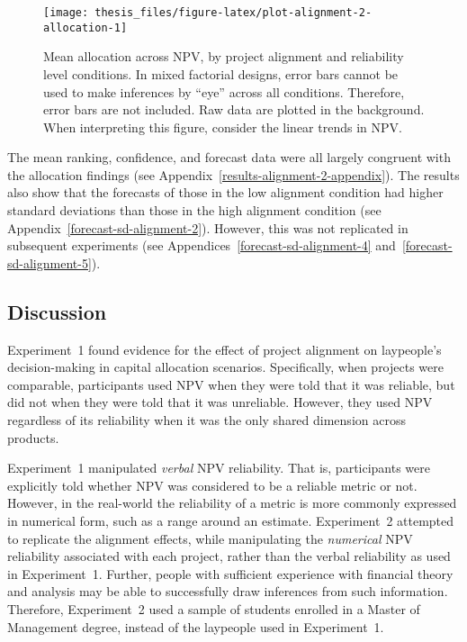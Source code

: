 \documentclass[a4paper, nobind]{templates/ociamthesis}
\theoremstyle{definition}
\theoremstyle{definition}
\theoremstyle{definition}
\theoremstyle{definition}
\theoremstyle{remark}
\begin{document}
\begin{figure}
\texttt{[image: thesis\_files/figure-latex/plot-alignment-2-allocation-1]} \caption{Mean allocation across NPV, by project alignment and reliability level conditions. In mixed factorial designs, error bars cannot be used to make inferences by ``eye'' across all conditions. Therefore, error bars are not included. Raw data are plotted in the background. When interpreting this figure, consider the linear trends in NPV.}\label{fig:plot-alignment-2-allocation}
\end{figure}

The mean ranking, confidence, and forecast data were all largely congruent with
the allocation findings (see Appendix~\ref{results-alignment-2-appendix}). The
results also show that the forecasts of those in the low alignment condition had
higher standard deviations than those in the high alignment condition (see
Appendix~\ref{forecast-sd-alignment-2}). However, this was not replicated in
subsequent experiments (see Appendices~\ref{forecast-sd-alignment-4}
and~\ref{forecast-sd-alignment-5}).

\subsection{Discussion}

Experiment~1 found evidence for the effect of project alignment on laypeople's
decision-making in capital allocation scenarios. Specifically, when projects
were comparable, participants used NPV when they were told that it was reliable, but
did not when they were told that it was unreliable. However, they used NPV
regardless of its reliability when it was the only shared dimension across products.

Experiment~1 manipulated \emph{verbal} NPV reliability. That is, participants were
explicitly told whether NPV was considered to be a reliable metric or not.
However, in the real-world the reliability of a metric is more commonly
expressed in numerical form, such as a range around an estimate. Experiment~2
attempted to replicate the alignment effects, while manipulating the \emph{numerical}
NPV reliability associated with each project, rather than the verbal reliability
as used in Experiment~1. Further, people with sufficient experience with
financial theory and analysis may be able to successfully draw inferences from
such information. Therefore, Experiment~2 used a sample of students enrolled in
a Master of Management degree, instead of the laypeople used in Experiment~1.
\end{document}

